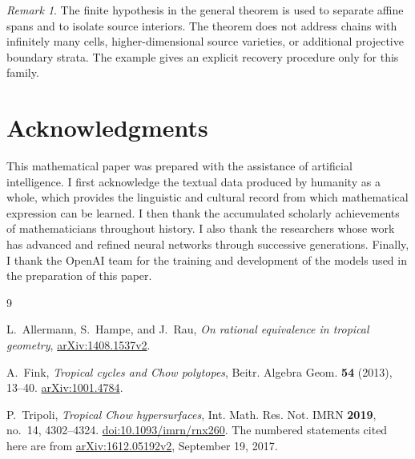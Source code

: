 \documentclass[11pt]{article}
\theoremstyle{definition}
\theoremstyle{remark}
\newtheorem{remark}[theorem]{Remark}
\begin{document}
\begin{remark}
The finite hypothesis in the general theorem is used to separate affine
spans and to isolate source interiors. The theorem does not address
chains with infinitely many cells, higher-dimensional source varieties,
or additional projective boundary strata. The example gives an explicit
recovery procedure only for this family.
\end{remark}

\section*{Acknowledgments}

This mathematical paper was prepared with the assistance of artificial intelligence.  I
first acknowledge the textual data produced by humanity as a whole, which
provides the linguistic and cultural record from which mathematical expression
can be learned.  I then thank the accumulated scholarly achievements of
mathematicians throughout history.  I also thank the researchers whose work has
advanced and refined neural networks through successive generations.  Finally,
I thank the OpenAI team for the training and development of the models used in
the preparation of this paper.

\begin{thebibliography}{9}

L.~Allermann, S.~Hampe, and J.~Rau,
\emph{On rational equivalence in tropical geometry},
\href{https://arxiv.org/abs/1408.1537v2}{arXiv:1408.1537v2}.

A.~Fink,
\emph{Tropical cycles and Chow polytopes},
Beitr. Algebra Geom. \textbf{54} (2013), 13--40.
\href{https://arxiv.org/abs/1001.4784}{arXiv:1001.4784}.

P.~Tripoli,
\emph{Tropical Chow hypersurfaces},
Int. Math. Res. Not. IMRN \textbf{2019}, no.~14, 4302--4324.
\href{https://doi.org/10.1093/imrn/rnx260}{doi:10.1093/imrn/rnx260}.
The numbered statements cited here are from
\href{https://arxiv.org/abs/1612.05192v2}{arXiv:1612.05192v2},
September 19, 2017.

\end{thebibliography}
\end{document}
